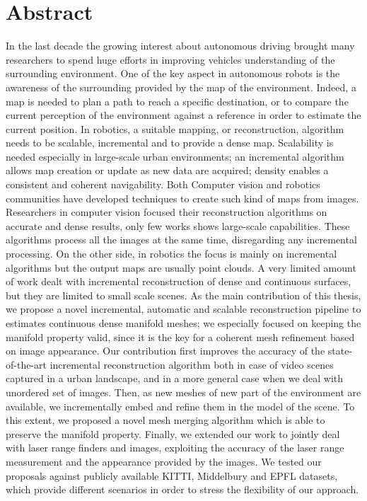 \chapter*{Abstract}
In the last decade the growing interest about autonomous driving brought many researchers to spend  huge efforts in improving  vehicles understanding of the surrounding environment.
One of the key aspect in autonomous robots is the awareness of the surrounding provided by the map of the environment.
Indeed, a map is needed to plan a path to reach a specific destination, or to compare the current perception of the environment against a reference in order to estimate the current position.
In robotics, a suitable mapping, or reconstruction, algorithm needs  to be scalable, incremental and to provide a dense map. 
Scalability is needed especially in large-scale urban environments; an incremental algorithm allows map creation or update as new data are acquired; density enables a consistent and coherent navigability.
Both Computer vision and robotics communities have developed techniques to create such kind of maps from images. 
Researchers in computer vision focused their reconstruction algorithms on accurate and dense results, only few works shows large-scale capabilities. These algorithms process all the images at the same time, disregarding any incremental processing. 
On the other side, in robotics the focus is mainly on incremental algorithms but the output maps are usually point clouds.
A very limited amount of work dealt with incremental reconstruction of dense and continuous surfaces, but they are limited to small scale scenes.
As the main contribution of this thesis, we propose a novel incremental, automatic and scalable reconstruction  pipeline to estimates continuous dense manifold meshes; we especially focused on keeping the manifold property valid, since it is the key for a coherent mesh refinement based on image appearance.  
Our contribution first improves the accuracy of the state-of-the-art incremental reconstruction algorithm both in case of video scenes captured in a urban landscape, and in a more general case when we deal with unordered set of images.
Then, as new meshes of new part of the environment are available, we incrementally embed and refine them in the model of the scene.
To this extent, we proposed a novel mesh merging algorithm which is able to preserve the manifold property.
Finally, we extended our work to jointly deal with laser range finders and images, exploiting the accuracy of the laser range measurement and the appearance provided by the images.
We tested our proposals against publicly available KITTI, Middelbury and EPFL datasets, which provide different scenarios in order to stress the flexibility of our approach.

